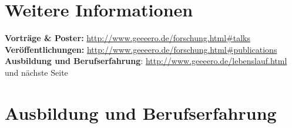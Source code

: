 \documentclass[a4paper]{simplecv}
\begin{document}
\section{Weitere Informationen}
\textbf{\sf Vorträge \& Poster:} \url{http://www.geeeero.de/forschung.html#talks}\\
\textbf{\sf Veröffentlichungen:} \url{http://www.geeeero.de/forschung.html#publications}\\
\textbf{\sf Ausbildung und Berufserfahrung}: \url{http://www.geeeero.de/lebenslauf.html} {\sf und nächste Seite}\\

\newpage
\section{Ausbildung und Berufserfahrung}
\label{education}
\end{document}
